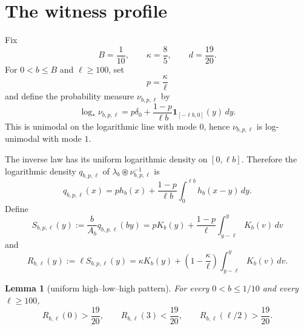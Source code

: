 \documentclass[11pt]{article}
\newtheorem{lemma}{Lemma}
\begin{document}
\section{The witness profile}

Fix
\begin{equation}\label{eq:constants}
 B=\frac1{10},\qquad \kappa=\frac85,\qquad d=\frac{19}{20}.
\end{equation}
For $0<b\le B$ and $\ell\ge100$, set
\[
 p=\frac{\kappa}{\ell}
\]
and define the probability measure $\nu_{b,p,\ell}$ by
\begin{equation}\label{eq:witness}
 \log_*\nu_{b,p,\ell}
 =p\delta_0+\frac{1-p}{\ell b}\mathbf 1_{[-\ell b,0]}(y)\,dy.
\end{equation}
This is unimodal on the logarithmic line with mode $0$, hence $\nu_{b,p,\ell}$ is log-unimodal with mode $1$.

The inverse law has its uniform logarithmic density on $[0,\ell b]$. Therefore the logarithmic density $q_{b,p,\ell}$ of $\lambda_b\circledast\nu_{b,p,\ell}^{-1}$ is
\[
 q_{b,p,\ell}(x)
 =p h_b(x)+\frac{1-p}{\ell b}\int_0^{\ell b}h_b(x-y)\,dy.
\]
Define
\begin{equation}\label{eq:S}
 S_{b,p,\ell}(y)
 :=\frac b{A_b}q_{b,p,\ell}(by)
 =pK_b(y)+\frac{1-p}{\ell}\int_{y-\ell}^{y}K_b(v)\,dv
\end{equation}
and
\begin{equation}\label{eq:R}
 R_{b,\ell}(y):=\ell S_{b,p,\ell}(y)
 =\kappa K_b(y)+\left(1-\frac{\kappa}{\ell}\right)
 \int_{y-\ell}^{y}K_b(v)\,dv.
\end{equation}

\begin{lemma}[uniform high--low--high pattern]\label{lem:crossings}
For every $0<b\le1/10$ and every $\ell\ge100$,
\begin{equation}\label{eq:HLH}
 R_{b,\ell}(0)>\frac{19}{20},\qquad
 R_{b,\ell}(3)<\frac{19}{20},\qquad
 R_{b,\ell}(\ell/2)>\frac{19}{20}.
\end{equation}
\end{lemma}
\end{document}
